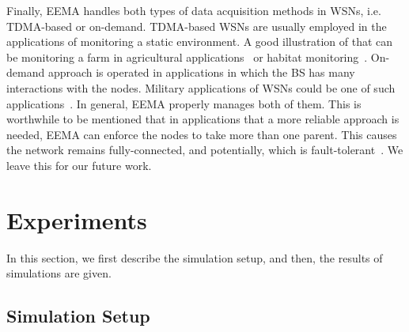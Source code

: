 \documentclass[journal]{IEEEtran}
\begin{document}
Finally, EEMA handles both types of data acquisition methods in WSNs, i.e. TDMA-based or on-demand.  TDMA-based WSNs are usually employed in the applications of monitoring a static environment.  A good illustration of that can be monitoring a farm in agricultural applications~\cite{survey-app} or habitat monitoring~\cite{habitat}.  On-demand approach is operated in applications in which the BS has many interactions with the nodes.  Military applications of WSNs could be one of such applications~\cite{survey-app}.  In general, EEMA properly manages both of them.  This is worthwhile to be mentioned that in applications that a more reliable approach is needed, EEMA can enforce the nodes to take more than one parent.  This causes the network remains fully-connected, and potentially, which is fault-tolerant~\cite{paradis2007}.  We leave this for our future work.

\section{Experiments}
\label{sec:exp}

In this section, we first describe the simulation setup, and then, the results of simulations are given.

\subsection{Simulation Setup}
\label{subsec:sim-set} 
\end{document}
